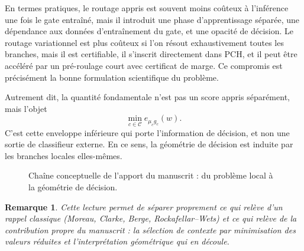 \documentclass[11pt,a4paper]{article}
\newtheorem{remark}{Remarque}[section]
\newcommand{\Ccal}{\mathcal C}
\begin{document}
En termes pratiques, le routage appris est souvent moins coûteux à l'inférence une fois le gate entraîné, mais il introduit une phase d'apprentissage séparée, une dépendance aux données d'entraînement du gate, et une opacité de décision. Le routage variationnel est plus coûteux si l'on résout exhaustivement toutes les branches, mais il est certifiable, il s'inscrit directement dans PCH, et il peut être accéléré par un pré-roulage court avec certificat de marge. Ce compromis est précisément la bonne formulation scientifique du problème.

Autrement dit, la quantité fondamentale n'est pas un score appris séparément, mais l'objet
\[
\min_{c\in\Ccal} e_{\mu_c g_c}(w).
\]
C'est cette enveloppe inférieure qui porte l'information de décision, et non une sortie de classifieur externe. En ce sens, la géométrie de décision est induite par les branches locales elles-mêmes.

\begin{figure}[ht]
\centering
{}
\caption{Chaîne conceptuelle de l'apport du manuscrit : du problème local à la géométrie de décision.}
\end{figure}

\begin{remark}
Cette lecture permet de séparer proprement ce qui relève d'un rappel classique (Moreau, Clarke, Berge, Rockafellar--Wets) et ce qui relève de la contribution propre du manuscrit : la sélection de contexte par minimisation des valeurs réduites et l'interprétation géométrique qui en découle.
\end{remark}
\end{document}
